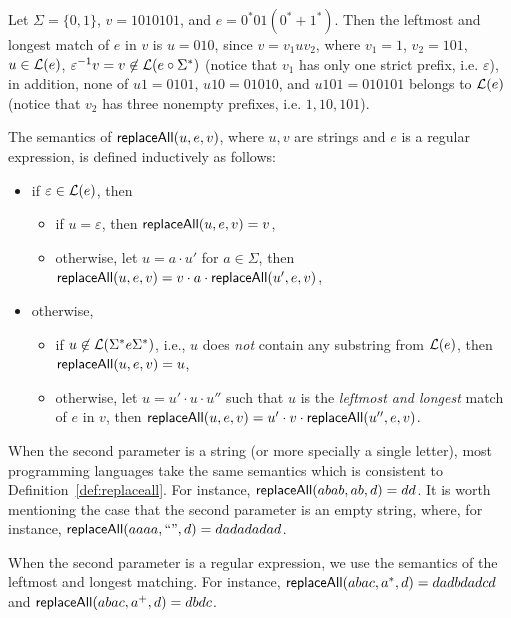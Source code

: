 \begin{example}
Let $\Sigma = \{0,1\}$, $v=1010101$, and $e = 0^*01(0^*+ 1^*)$. Then the leftmost and longest match of $e$ in $v$ is $u=010$, since $v = v_1 u v_2 $, where  $v_1 = 1$, $v_2 = 101$, $u \in \mathcal{L}(e)$, $\varepsilon^{-1} v = v \not \in \mathcal{L}(e \circ \Sigma^*)$ (notice that $v_1$ has only one strict prefix, i.e. $\varepsilon$), in addition, none of $u 1=0101$, $u 10=01010$, and $u101=010101$ belongs to $\mathcal{L}(e)$ (notice that $v_2$ has three nonempty prefixes, i.e. $1,10,101$). 
\end{example}

\begin{definition} \label{def:replaceall}
The semantics of $\mathsf{replaceAll}(u, e, v)$, where $u, v$ are strings and $e$ is a regular expression, is defined inductively as follows:
\begin{itemize}
	\item if $\varepsilon \in \mathcal{L}(e)$, then
	\begin{itemize}
	\item if $u = \varepsilon$, then $\mathsf{replaceAll}(u,e, v) = v$,
	
	\item otherwise, let $u = a \cdot u'$ for $a \in \Sigma$, then $\mathsf{replaceAll}(u, e, v) =v \cdot a \cdot \mathsf{replaceAll}(u', e, v)$,
	\end{itemize}
%
	\item otherwise,
	\begin{itemize}
	\item if $u \not \in \mathcal{L}(\Sigma^\ast e \Sigma^\ast)$, i.e., $u$ does \emph{not} contain any substring from $\mathcal{L}(e)$, then $\mathsf{replaceAll}(u, e, v) = u$, 
	\item otherwise, let $u = u' \cdot u \cdot u''$ such that $u$ is the \emph{leftmost and longest} match of $e$ in $v$, then $\mathsf{replaceAll}(u, e, v) = u' \cdot v \cdot \mathsf{replaceAll}(u'', e, v)$.
	\end{itemize}
\end{itemize}
\end{definition}

\begin{example}
When the second parameter is a string (or more specially a single letter), most programming languages take the same semantics which is consistent to Definition~\ref{def:replaceall}. For instance,  $\mathsf{replaceAll}(abab, ab, d) =dd$. It is worth mentioning the case that the second parameter is an empty string, where, for instance,  $\mathsf{replaceAll}(aaaa, ``", d) =dadadadad$.

When the second parameter is a regular expression, we use the semantics of the leftmost and longest matching. For instance, $\mathsf{replaceAll}(abac, a^*, d) =d a d b d a d c d$ and $\mathsf{replaceAll}(abac, a^+, d)=dbdc$. 
\end{example}


